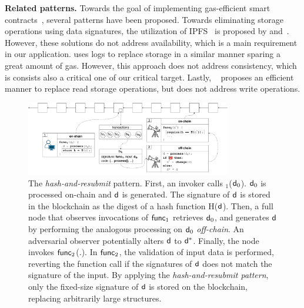 \noindent \textbf{Related patterns.} Towards the goal of implementing
gas-efficient smart contracts~\cite{contract-opt-1, contract-opt-2,
slither, madmax}, several patterns have been proposed. Towards eliminating
storage operations using data signatures, the utilization of IPFS~\cite{ipfs}
is proposed by \cite{ipfs-1} and~\cite{ipfs-2}. However, these solutions do not
address availability, which is a main requirement in our application.
\cite{logs} uses logs to replace storage in a similar manner sparing a great
amount of gas.  However, this approach does not address consistency, which is
consists also a critical one of our critical target. Lastly,
~\cite{memory-array} proposes an efficient manner to replace read storage
operations, but does not address write operations.


\begin{figure}[h]
    \begin{center} \includegraphics[width=0.8\textwidth]{figures/har-pattern.pdf}
    \end{center}

    \caption{The \emph{hash-and-resubmit} pattern. First, an invoker calls
        \proc$_1$($\mathsf{d}_0$). $\mathsf{d}_0$ is processed on-chain and $\mathsf{d}$ is
        generated. The signature of $\mathsf{d}$ is stored in the blockchain as the
        digest of a hash function \textsf{H}($\mathsf{d}$). Then, a full node that
        observes invocations of $\textsf{func}_1$ retrieves $\mathsf{d}_0$, and generates
        $\mathsf{d}$ by performing the analogous processing on $\mathsf{d}_0$
        \emph{off-chain}. An adversarial observer potentially alters $\mathsf{d}$ to
        $\mathsf{d}^*$.  Finally, the node invokes $\textsf{func}_2$(.). In $\textsf{func}_2$, the
        validation of input data is performed, reverting the function call if
        the signatures of $\mathsf{d}$ does not match the signature of the input. By
        applying the \emph{hash-and-resubmit pattern}, only the fixed-size
        signature of $\mathsf{d}$ is stored on the blockchain, replacing arbitrarily
        large structures.}

        \label{fig:har-pattern}
\end{figure}


